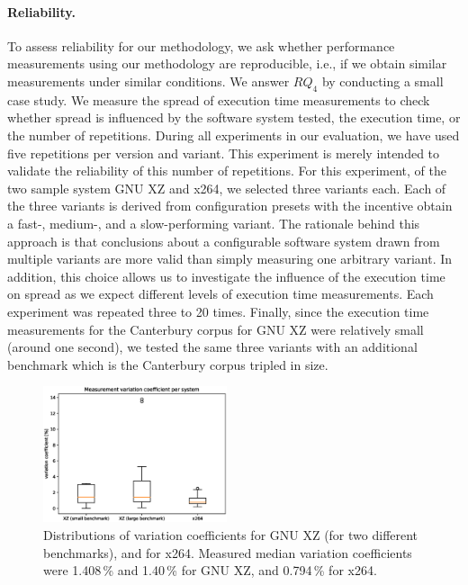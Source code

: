 \paragraph{Reliability.} To assess reliability for our methodology, we ask
whether performance measurements using our methodology are reproducible, i.e.,
if we obtain similar measurements under similar conditions. We answer
$RQ_4$ by conducting a small case study. We measure the spread of
execution time measurements to check whether spread is influenced by the
software system tested, the execution time, or the number of repetitions.
During all experiments in our evaluation, we have used five repetitions per
version and variant. This experiment is merely intended to validate the
reliability of this number of repetitions. For this experiment, of the two
sample system GNU XZ and x264, we selected three variants each. Each of the
three variants is derived from configuration presets with the incentive obtain
a fast-,  medium-, and a slow-performing variant. The rationale behind this
approach is that conclusions about a configurable software system drawn from
multiple variants are more valid than simply measuring one arbitrary variant.
In addition, this choice allows us to investigate the influence of the
execution time on spread as we expect different levels of execution time
measurements. Each experiment was repeated three to 20 times. Finally, since
the execution time measurements for the Canterbury corpus for GNU XZ were
relatively small (around one second), we tested the same three variants with an
additional benchmark which is the Canterbury corpus tripled in size.

\begin{figure}
 \begin{center}
   \vspace{-1cm}
   \includegraphics[width=0.48\textwidth]{images/reliability_1.eps}
 \end{center}
 \caption{Distributions of variation coefficients for
 GNU XZ (for two different benchmarks), and for x264.
 Measured median variation coefficients were
 1.408\,\% and 1.40\,\% for GNU XZ, and 0.794\,\% for
 x264.}\label{fig:reliability_1}
\end{figure}

